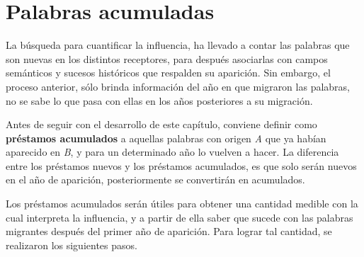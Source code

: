 \chapter{Palabras acumuladas}

La búsqueda para cuantificar la influencia, ha llevado a contar las
palabras que son nuevas en los distintos receptores, para después asociarlas con  campos semánticos y sucesos históricos que respalden su aparición. Sin embargo, el proceso anterior, sólo brinda información del año en que migraron las palabras, no se sabe lo que pasa con ellas en los años posteriores a su migración. 

Antes de seguir con el desarrollo de este capítulo, conviene definir como \textbf{préstamos acumulados} a aquellas palabras con origen \textit{A} que ya habían aparecido en \textit{B}, y para un determinado año lo vuelven a hacer.  La diferencia entre los préstamos nuevos y los préstamos acumulados, es que solo serán nuevos en el año de aparición, posteriormente se convertirán en acumulados.

Los préstamos acumulados serán útiles para obtener una cantidad medible con la cual interpreta la influencia, y a partir de ella saber que sucede con las palabras migrantes después del primer año de aparición.  Para lograr tal cantidad, se realizaron los siguientes pasos.



